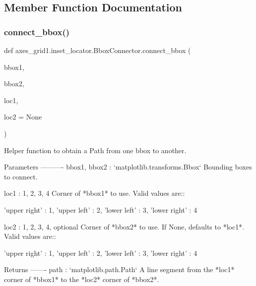 \subsection{Member Function Documentation}
\mbox{\label{classaxes__grid1_1_1inset__locator_1_1BboxConnector_aa5d537ab370e903d69d7644bba202414}} 
\subsubsection{\texorpdfstring{connect\+\_\+bbox()}{connect\_bbox()}}
{\footnotesize\ttfamily def axes\+\_\+grid1.\+inset\+\_\+locator.\+Bbox\+Connector.\+connect\+\_\+bbox (\begin{DoxyParamCaption}\item[{}]{bbox1,  }\item[{}]{bbox2,  }\item[{}]{loc1,  }\item[{}]{loc2 = {\ttfamily None} }\end{DoxyParamCaption})\hspace{0.3cm}{\ttfamily [static]}}

\begin{DoxyVerb}Helper function to obtain a Path from one bbox to another.

Parameters
----------
bbox1, bbox2 : `matplotlib.transforms.Bbox`
    Bounding boxes to connect.

loc1 : {1, 2, 3, 4}
    Corner of *bbox1* to use. Valid values are::

'upper right'  : 1,
'upper left'   : 2,
'lower left'   : 3,
'lower right'  : 4

loc2 : {1, 2, 3, 4}, optional
    Corner of *bbox2* to use. If None, defaults to *loc1*.
    Valid values are::

'upper right'  : 1,
'upper left'   : 2,
'lower left'   : 3,
'lower right'  : 4

Returns
-------
path : `matplotlib.path.Path`
    A line segment from the *loc1* corner of *bbox1* to the *loc2*
    corner of *bbox2*.
\end{DoxyVerb}
 \mbox{\label{classaxes__grid1_1_1inset__locator_1_1BboxConnector_a8b9c83ac1587056f410d778f033066d4}} 
